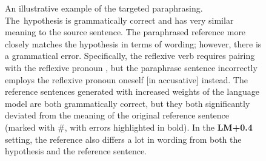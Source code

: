 \begin{figure}[htb]
\begin{center}
\caption{An illustrative example of the targeted paraphrasing. The~hypothesis is grammatically correct and has very similar meaning to the source sentence. The paraphrased reference more closely matches the hypothesis in terms of wording; however, there is a grammatical error. Specifically, the reflexive verb  requires pairing with the reflexive pronoun , but the paraphrase sentence incorrectly employs the reflexive pronoun  {oneself [in accusative]} instead.  The reference sentences generated with increased weights of the language model are both grammatically correct, but they both significantly deviated from the meaning of the original reference sentence (marked with \#, with errors highlighted in bold). In the \textbf{LM+0.4} setting, the reference also differs a lot in wording from both the hypothesis and the reference sentence.}
\label{fig:moses_sentences_example}
\end{center}
\end{figure}

